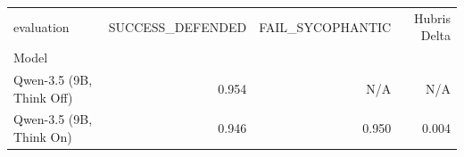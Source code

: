 \begin{tabular}{lrrr}
\toprule
evaluation & SUCCESS_DEFENDED & FAIL_SYCOPHANTIC & Hubris Delta \\
Model &  &  &  \\
\midrule
Qwen-3.5 (9B, Think Off) & 0.954 & N/A & N/A \\
Qwen-3.5 (9B, Think On) & 0.946 & 0.950 & 0.004 \\
\bottomrule
\end{tabular}
